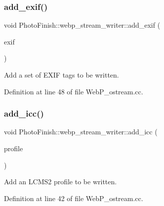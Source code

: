 \subsubsection{\texorpdfstring{add\+\_\+exif()}{add\_exif()}}
{\footnotesize\ttfamily void Photo\+Finish\+::webp\+\_\+stream\+\_\+writer\+::add\+\_\+exif (\begin{DoxyParamCaption}\item[{const Exiv2\+::\+Exif\+Data \&}]{exif }\end{DoxyParamCaption})}



Add a set of E\+X\+IF tags to be written. 



Definition at line 48 of file Web\+P\+\_\+ostream.\+cc.

\mbox{\label{class_photo_finish_1_1webp__stream__writer_aafd15e69e86d3e4819eb38baa763854f}} 
\subsubsection{\texorpdfstring{add\+\_\+icc()}{add\_icc()}}
{\footnotesize\ttfamily void Photo\+Finish\+::webp\+\_\+stream\+\_\+writer\+::add\+\_\+icc (\begin{DoxyParamCaption}\item[{\hyperlink{class_c_m_s_1_1_profile_a7d5a80e1317d17dbfdf5ae69820ab08b}{C\+M\+S\+::\+Profile\+::ptr}}]{profile }\end{DoxyParamCaption})}



Add an L\+C\+M\+S2 profile to be written. 



Definition at line 42 of file Web\+P\+\_\+ostream.\+cc.

\mbox{\label{class_photo_finish_1_1webp__stream__writer_ad22643d45515cfbae75690571f80e55d}} 
